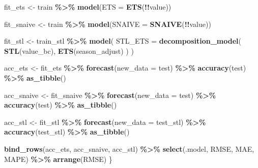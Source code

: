 \documentclass[
  11pt,
]{article}
\newenvironment{Shaded}{\begin{snugshade}}{\end{snugshade}}
\newcommand{\AttributeTok}[1]{\textcolor[rgb]{0.13,0.29,0.53}{#1}}
\newcommand{\FunctionTok}[1]{\textcolor[rgb]{0.13,0.29,0.53}{\textbf{#1}}}
\newcommand{\NormalTok}[1]{#1}
\newcommand{\OtherTok}[1]{\textcolor[rgb]{0.56,0.35,0.01}{#1}}
\newcommand{\SpecialCharTok}[1]{\textcolor[rgb]{0.81,0.36,0.00}{\textbf{#1}}}
\begin{document}
\begin{Shaded}
\begin{Highlighting}[]
\NormalTok{  fit\_ets }\OtherTok{\textless{}{-}}\NormalTok{ train }\SpecialCharTok{\%\textgreater{}\%}
    \FunctionTok{model}\NormalTok{(}\AttributeTok{ETS =} \FunctionTok{ETS}\NormalTok{(}\SpecialCharTok{!!}\NormalTok{value))}

\NormalTok{  fit\_snaive }\OtherTok{\textless{}{-}}\NormalTok{ train }\SpecialCharTok{\%\textgreater{}\%}
    \FunctionTok{model}\NormalTok{(}\AttributeTok{SNAIVE =} \FunctionTok{SNAIVE}\NormalTok{(}\SpecialCharTok{!!}\NormalTok{value))}

\NormalTok{  fit\_stl }\OtherTok{\textless{}{-}}\NormalTok{ train\_stl }\SpecialCharTok{\%\textgreater{}\%}
    \FunctionTok{model}\NormalTok{(}
      \AttributeTok{STL\_ETS =} \FunctionTok{decomposition\_model}\NormalTok{(}
        \FunctionTok{STL}\NormalTok{(value\_bc),}
        \FunctionTok{ETS}\NormalTok{(season\_adjust)}
\NormalTok{      )}
\NormalTok{    )}

\NormalTok{  acc\_ets }\OtherTok{\textless{}{-}}\NormalTok{ fit\_ets }\SpecialCharTok{\%\textgreater{}\%}
    \FunctionTok{forecast}\NormalTok{(}\AttributeTok{new\_data =}\NormalTok{ test) }\SpecialCharTok{\%\textgreater{}\%}
    \FunctionTok{accuracy}\NormalTok{(test) }\SpecialCharTok{\%\textgreater{}\%}
    \FunctionTok{as\_tibble}\NormalTok{()}

\NormalTok{  acc\_snaive }\OtherTok{\textless{}{-}}\NormalTok{ fit\_snaive }\SpecialCharTok{\%\textgreater{}\%}
    \FunctionTok{forecast}\NormalTok{(}\AttributeTok{new\_data =}\NormalTok{ test) }\SpecialCharTok{\%\textgreater{}\%}
    \FunctionTok{accuracy}\NormalTok{(test) }\SpecialCharTok{\%\textgreater{}\%}
    \FunctionTok{as\_tibble}\NormalTok{()}

\NormalTok{  acc\_stl }\OtherTok{\textless{}{-}}\NormalTok{ fit\_stl }\SpecialCharTok{\%\textgreater{}\%}
    \FunctionTok{forecast}\NormalTok{(}\AttributeTok{new\_data =}\NormalTok{ test\_stl) }\SpecialCharTok{\%\textgreater{}\%}
    \FunctionTok{accuracy}\NormalTok{(test\_stl) }\SpecialCharTok{\%\textgreater{}\%}
    \FunctionTok{as\_tibble}\NormalTok{()}

  \FunctionTok{bind\_rows}\NormalTok{(acc\_ets, acc\_snaive, acc\_stl) }\SpecialCharTok{\%\textgreater{}\%}
    \FunctionTok{select}\NormalTok{(.model, RMSE, MAE, MAPE) }\SpecialCharTok{\%\textgreater{}\%}
    \FunctionTok{arrange}\NormalTok{(RMSE)}
\NormalTok{\}}
\end{Highlighting}
\end{Shaded}
\end{document}
